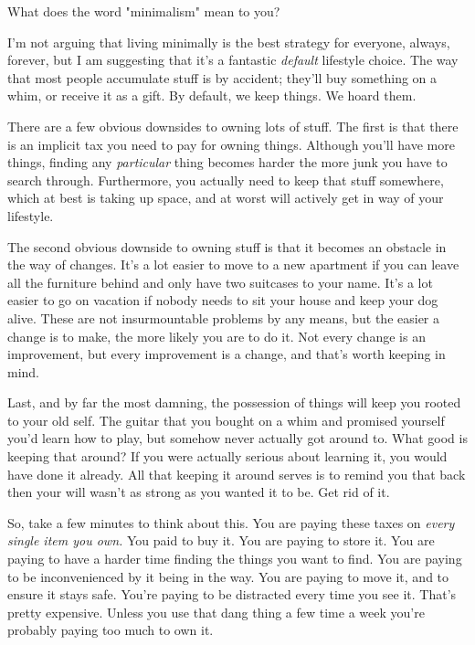 \documentclass[]{book}
\begin{document}
What does the word "minimalism" mean to you?


I'm not arguing that living minimally is the best strategy for everyone, always,
forever, but I am suggesting that it's a fantastic \emph{default} lifestyle
choice. The way that most people accumulate stuff is by accident; they'll buy
something on a whim, or receive it as a gift. By default, we keep things. We
hoard them.

There are a few obvious downsides to owning lots of stuff. The first is that
there is an implicit tax you need to pay for owning things. Although you'll have
more things, finding any \emph{particular} thing becomes harder the more junk
you have to search through. Furthermore, you actually need to keep that stuff
somewhere, which at best is taking up space, and at worst will actively get in
way of your lifestyle.

The second obvious downside to owning stuff is that it becomes an obstacle in
the way of changes. It's a lot easier to move to a new apartment if you can
leave all the furniture behind and only have two suitcases to your name. It's a
lot easier to go on vacation if nobody needs to sit your house and keep your dog
alive. These are not insurmountable problems by any means, but the easier a
change is to make, the more likely you are to do it. Not every change is an
improvement, but every improvement is a change, and that's worth keeping in
mind.

Last, and by far the most damning, the possession of things will keep you rooted
to your old self. The guitar that you bought on a whim and promised yourself
you'd learn how to play, but somehow never actually got around to. What good is
keeping that around? If you were actually serious about learning it, you would
have done it already. All that keeping it around serves is to remind you that
back then your will wasn't as strong as you wanted it to be. Get rid of it.


So, take a few minutes to think about this. You are paying these taxes on
\emph{every single item you own.} You paid to buy it. You are paying to store
it. You are paying to have a harder time finding the things you want to find.
You are paying to be inconvenienced by it being in the way. You are paying to
move it, and to ensure it stays safe. You're paying to be distracted every time
you see it. That's pretty expensive. Unless you use that dang thing a few time a
week you're probably paying too much to own it.
\end{document}
